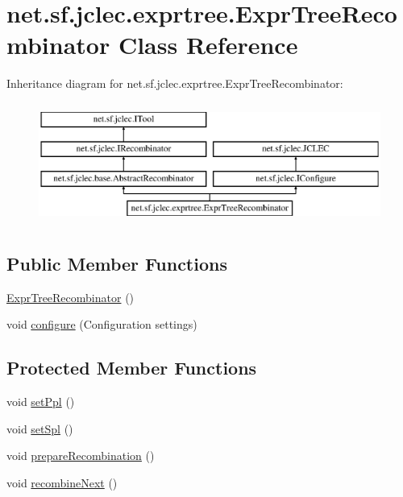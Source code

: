 \hypertarget{classnet_1_1sf_1_1jclec_1_1exprtree_1_1_expr_tree_recombinator}{\section{net.\-sf.\-jclec.\-exprtree.\-Expr\-Tree\-Recombinator Class Reference}
\label{classnet_1_1sf_1_1jclec_1_1exprtree_1_1_expr_tree_recombinator}
}
Inheritance diagram for net.\-sf.\-jclec.\-exprtree.\-Expr\-Tree\-Recombinator\-:\begin{figure}[H]
\begin{center}
\leavevmode
\includegraphics[height=4.000000cm]{classnet_1_1sf_1_1jclec_1_1exprtree_1_1_expr_tree_recombinator}
\end{center}
\end{figure}
\subsection*{Public Member Functions}
\begin{DoxyCompactItemize}
\item 
\hyperlink{classnet_1_1sf_1_1jclec_1_1exprtree_1_1_expr_tree_recombinator_a26d03859a1a71be818d81eb0ed95554f}{Expr\-Tree\-Recombinator} ()
\item 
void \hyperlink{classnet_1_1sf_1_1jclec_1_1exprtree_1_1_expr_tree_recombinator_a665845477525ccf265a2e8bf147de695}{configure} (Configuration settings)
\end{DoxyCompactItemize}
\subsection*{Protected Member Functions}
\begin{DoxyCompactItemize}
\item 
void \hyperlink{classnet_1_1sf_1_1jclec_1_1exprtree_1_1_expr_tree_recombinator_aa093b329ea2bb0c113b5b8c48107452b}{set\-Ppl} ()
\item 
void \hyperlink{classnet_1_1sf_1_1jclec_1_1exprtree_1_1_expr_tree_recombinator_adcd6c3e1629ec2aca0c27d43587c9ddf}{set\-Spl} ()
\item 
void \hyperlink{classnet_1_1sf_1_1jclec_1_1exprtree_1_1_expr_tree_recombinator_a19632d02d287f5e08768c824695df2ac}{prepare\-Recombination} ()
\item 
void \hyperlink{classnet_1_1sf_1_1jclec_1_1exprtree_1_1_expr_tree_recombinator_adf91b5652ebb30517f565948828adfab}{recombine\-Next} ()
\end{DoxyCompactItemize}
